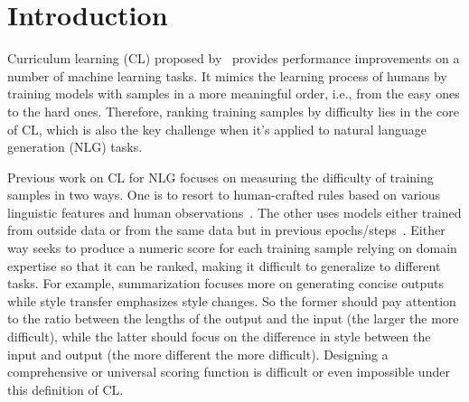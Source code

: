 \section{Introduction}
\label{sec:intro}

Curriculum learning (CL) proposed by~\citet{bengio2009curriculum} provides performance improvements on a number of machine learning tasks.
It mimics the learning process of humans by training models with samples in a 
more meaningful order, i.e., from the easy ones to the hard ones.
Therefore, ranking training samples by difficulty lies in the core of CL, 
which is also the key challenge when it's applied to natural language generation (NLG) 
tasks.

Previous work on CL for NLG focuses on measuring the difficulty of training samples 
in two ways. One is to resort to human-crafted rules based on various linguistic features 
and human observations~\cite{liu2018curriculum,kocmi2017curriculum}. 
The other uses models either trained from outside data or from the same data but
in previous epochs/steps~\cite{zhou2020uncertainty,kumar2019reinforcement,shen2020cdl}.
Either way seeks to produce a numeric score for each training sample relying on domain expertise so that it can
be ranked,  
making it difficult to generalize 
to different tasks. For example, summarization focuses more on generating concise 
outputs while style transfer emphasizes style changes. So the former should pay 
attention to the ratio between the lengths of the output and the input (the larger
the more difficult), while the 
latter should focus on the difference in style between the input and output (the more
different the more difficult).
Designing a comprehensive or universal scoring function is difficult or 
even impossible under this definition of CL.
